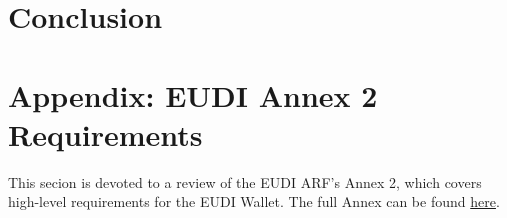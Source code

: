 \documentclass{iacrtrans}
\newcommand{\jbel}[1]{{\color{blue}{}jbel: #1}}
\begin{document}


\section{Conclusion}
\label{sec:conclusion}




\section{Appendix: EUDI Annex 2 Requirements}
\label{sec:annex}

This secion is devoted to a review of the EUDI ARF's Annex 2, which covers high-level requirements for the EUDI Wallet. 
The full Annex can be found \href{https://eu-digital-identity-wallet.github.io/eudi-doc-architecture-and-reference-framework/1.4.0/annexes/annex-2/annex-2-high-level-requirements/#a231-topic-1-accessing-public-and-private-online-services-with-eudi-wallet}{here}.


\end{document}

